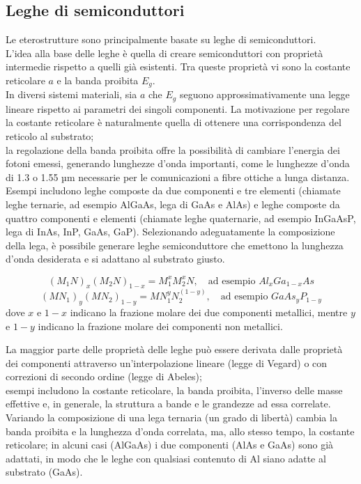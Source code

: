 \subsection{Leghe di semiconduttori}
Le eterostrutture sono principalmente basate su leghe di semiconduttori.\\
L'idea alla base delle leghe è quella di creare semiconduttori con proprietà intermedie rispetto a quelli già esistenti. Tra queste proprietà vi sono la costante reticolare $a$ e la banda proibita $E_g$. \\
In diversi sistemi materiali, sia $a$ che $E_g$ seguono approssimativamente una legge lineare rispetto ai parametri dei singoli componenti. La motivazione per regolare la costante reticolare è naturalmente quella di ottenere una corrispondenza del reticolo al substrato; \\
la regolazione della banda proibita offre la possibilità di cambiare l'energia dei fotoni emessi, generando lunghezze d'onda importanti, come le lunghezze d'onda di 1.3 o 1.55 µm necessarie per le comunicazioni a fibre ottiche a lunga distanza.\\
Esempi includono leghe composte da due componenti e tre elementi (chiamate leghe ternarie, ad esempio AlGaAs, lega di GaAs e AlAs) e leghe composte da quattro componenti e elementi (chiamate leghe quaternarie, ad esempio InGaAsP, lega di InAs, InP, GaAs, GaP). Selezionando adeguatamente la composizione della lega, è possibile generare leghe semiconduttore che emettono la lunghezza d'onda desiderata e si adattano al substrato giusto.

\[
(M_1N)_x (M_2N)_{1-x} = M_1^x M_2^x N, \quad \text{ad esempio } Al_xGa_{1-x}As
\]
\[
(MN_1)_y (MN_2)_{1-y} = MN_1^y N_2^{(1-y)}, \quad \text{ad esempio } GaAs_yP_{1-y}
\]
dove $x$ e $1-x$ indicano la frazione molare dei due componenti metallici, mentre $y$ e $1-y$ indicano la frazione molare dei componenti non metallici.

La maggior parte delle proprietà delle leghe può essere derivata dalle proprietà dei componenti attraverso un'interpolazione lineare (legge di Vegard) o con correzioni di secondo ordine (legge di Abeles); \\
esempi includono la costante reticolare, la banda proibita, l'inverso delle masse effettive e, in generale, la struttura a bande e le grandezze ad essa correlate.\\
Variando la composizione di una lega ternaria (un grado di libertà) cambia la banda proibita e la lunghezza d'onda correlata, ma, allo stesso tempo, la costante reticolare; in alcuni casi (AlGaAs) i due componenti (AlAs e GaAs) sono già adattati, in modo che le leghe con qualsiasi contenuto di Al siano adatte al substrato (GaAs).

